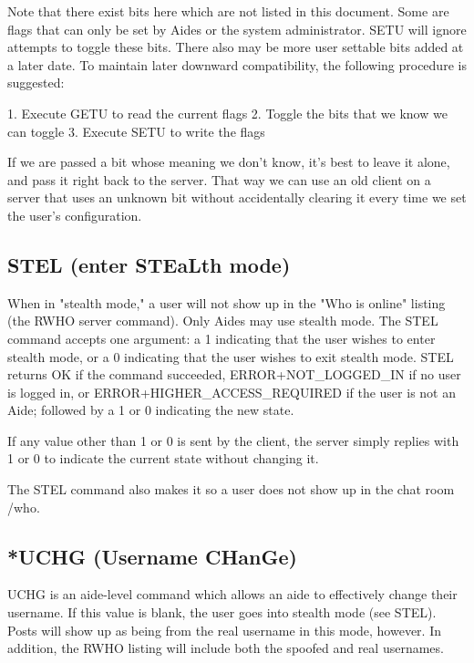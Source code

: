  Note that there exist bits here which are not listed in this document.  Some
are flags that can only be set by Aides or the system administrator.  SETU
will ignore attempts to toggle these bits.  There also may be more user
settable bits added at a later date.  To maintain later downward compatibility,
the following procedure is suggested:

 1. Execute GETU to read the current flags
 2. Toggle the bits that we know we can toggle
 3. Execute SETU to write the flags

 If we are passed a bit whose meaning we don't know, it's best to leave it
alone, and pass it right back to the server.  That way we can use an old
client on a server that uses an unknown bit without accidentally clearing
it every time we set the user's configuration.



\subsection{STEL (enter STEaLth mode)}

 When in "stealth mode," a user will not show up in the "Who is online"
listing (the RWHO server command).  Only Aides may use stealth mode.  The
STEL command accepts one argument: a 1 indicating that the user wishes to
enter stealth mode, or a 0 indicating that the user wishes to exit stealth
mode.  STEL returns OK if the command succeeded, ERROR+NOT_LOGGED_IN if no
user is logged in, or ERROR+HIGHER_ACCESS_REQUIRED if the user is not an Aide;
followed by a 1 or 0 indicating the new state.

 If any value other than 1 or 0 is sent by the client, the server simply
replies with 1 or 0 to indicate the current state without changing it.

The STEL command also makes it so a user does not show up in the chat room
/who.



\subsection{*UCHG (Username CHanGe)}

 UCHG is an aide-level command which allows an aide to effectively change their
username.  If this value is blank, the user goes into stealth mode (see
STEL).  Posts
will show up as being from the real username in this mode, however.  In
addition, the RWHO listing will include both the spoofed and real usernames.

